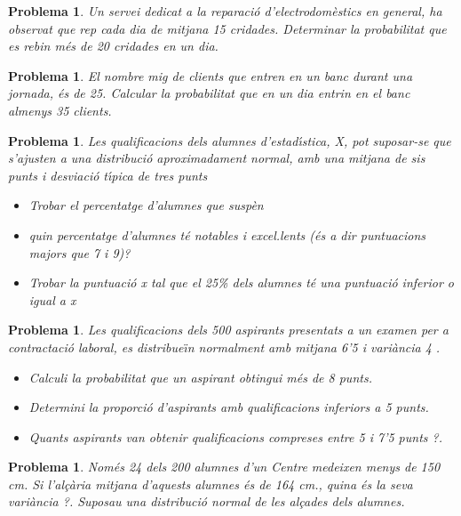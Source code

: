 \documentclass[11pt]{article}
\newcounter{prbcont}
\newtheorem{problema}[prbcont]{Problema}
\newcommand{\sol}[1]{{\textbf{\footnotetext[\the\problemes]{Sol.: #1} }}}
\begin{document}
\begin{problema}
Un servei dedicat a la reparaci\'o d'electrodom\`estics en general, ha observat que rep cada dia de mitjana 15 cridades. Determinar la probabilitat que es rebin m\'es de 20 cridades en un dia.%
\end{problema}

\begin{problema}
El nombre mig de clients que entren en un banc durant una jornada, \'es de 25. Calcular la probabilitat que en un dia entrin en el banc almenys 35 clients. %
\end{problema}

\begin{problema}
Les qualificacions dels alumnes d'estad\'{\i}stica, X, pot suposar-se que s'ajusten a una distribuci\'o aproximadament normal, amb una mitjana de sis punts i desviaci\'o t\'{\i}pica de tres punts 
\begin{itemize}
\item Trobar el percentatge d'alumnes que susp\`en 
\item quin percentatge d'alumnes t\'e notables i excel.lents (\'es a dir puntuacions majors que 7 i 9)?
\item Trobar la puntuaci\'o x tal que el 25\% dels alumnes t\'e una puntuaci\'o inferior o igual a x 
\end{itemize} %
\end{problema}

\begin{problema}
Les qualificacions dels 500 aspirants presentats a un examen per a contractaci\'o laboral, es distribue\"{\i}n normalment amb mitjana 6'5 i vari\`ancia 4 . 
\begin{itemize}
\item Calculi la probabilitat que un aspirant obtingui m\'es de 8 punts. 
\item Determini la proporci\'o d'aspirants amb qualificacions inferiors a 5 punts. 
\item Quants aspirants van obtenir qualificacions compreses entre 5 i 7'5 punts ?. 
\end{itemize}
\end{problema}

\begin{problema}
Nom\'es 24 dels 200 alumnes d'un Centre medeixen menys de 150 cm. Si l'al\c{c}\`aria mitjana d'aquests alumnes \'es de 164 cm., quina \'es la seva vari\`ancia ?. Suposau una distribuci\'o normal de les al\c{c}ades dels alumnes.
\end{problema}
\end{document}
